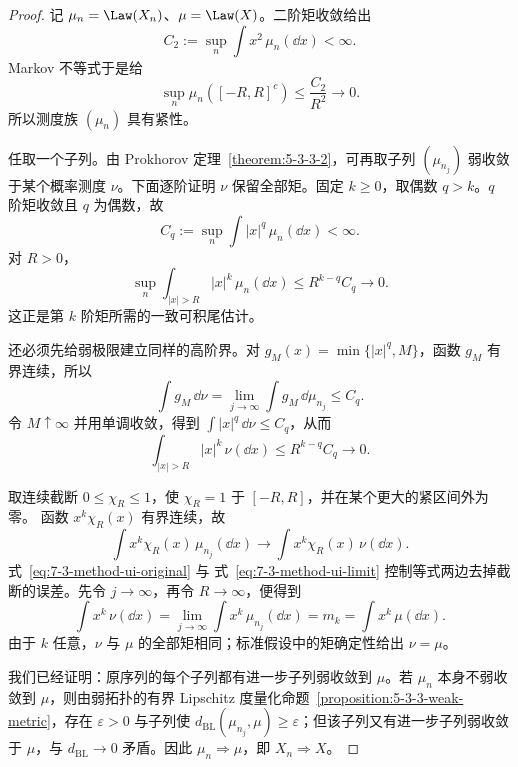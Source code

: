 \begin{proof}
记 $\mu_n=\Law(X_n)$、$\mu=\Law(X)$。二阶矩收敛给出
\[
 C_2:=\sup_n\int x^2\,\mu_n(\dd x)<\infty.
\]
Markov 不等式于是给
\[
 \sup_n\mu_n([-R,R]^c)
 \leq\frac{C_2}{R^2}\longrightarrow0.
\]
所以测度族 $(\mu_n)$ 具有紧性。

任取一个子列。由 Prokhorov 定理~\ref{theorem:5-3-3-2}，可再取子列
$(\mu_{n_j})$ 弱收敛于某个概率测度 $\nu$。下面逐阶证明 $\nu$ 保留全部矩。固定 $k\geq0$，取偶数
$q>k$。$q$ 阶矩收敛且 $q$ 为偶数，故
\[
 C_q:=\sup_n\int|x|^q\,\mu_n(\dd x)<\infty.
\]
对 $R>0$，
\begin{equation}\label{eq:7-3-method-ui-original}
 \sup_n\int_{|x|>R}|x|^k\,\mu_n(\dd x)
 \leq R^{k-q}C_q\longrightarrow0.
\end{equation}
这正是第 $k$ 阶矩所需的一致可积尾估计。

还必须先给弱极限建立同样的高阶界。对
$g_M(x)=\min\{|x|^q,M\}$，函数 $g_M$ 有界连续，所以
\[
 \int g_M\,\dd\nu
 =\lim_{j\to\infty}\int g_M\,\dd\mu_{n_j}\leq C_q.
\]
令 $M\uparrow\infty$ 并用单调收敛，得到
$\int|x|^q\,\dd\nu\leq C_q$，从而
\begin{equation}\label{eq:7-3-method-ui-limit}
 \int_{|x|>R}|x|^k\,\nu(\dd x)
 \leq R^{k-q}C_q\longrightarrow0.
\end{equation}

取连续截断 $0\leq\chi_R\leq1$，使 $\chi_R=1$ 于 $[-R,R]$，并在某个更大的紧区间外为零。
函数 $x^k\chi_R(x)$ 有界连续，故
\[
 \int x^k\chi_R(x)\,\mu_{n_j}(\dd x)
 \longrightarrow
 \int x^k\chi_R(x)\,\nu(\dd x).
\]
式~\eqref{eq:7-3-method-ui-original} 与
式~\eqref{eq:7-3-method-ui-limit} 控制等式两边去掉截断的误差。先令 $j\to\infty$，再令
$R\to\infty$，便得到
\[
 \int x^k\,\nu(\dd x)
 =\lim_{j\to\infty}\int x^k\,\mu_{n_j}(\dd x)
 =m_k=\int x^k\,\mu(\dd x).
\]
由于 $k$ 任意，$\nu$ 与 $\mu$ 的全部矩相同；标准假设中的矩确定性给出 $\nu=\mu$。

我们已经证明：原序列的每个子列都有进一步子列弱收敛到 $\mu$。若 $\mu_n$ 本身不弱收敛到
$\mu$，则由弱拓扑的有界 Lipschitz 度量化命题~\ref{proposition:5-3-3-weak-metric}，存在
$\varepsilon>0$ 与子列使
$d_{\mathrm{BL}}(\mu_{n_j},\mu)\geq\varepsilon$；但该子列又有进一步子列弱收敛于 $\mu$，与
$d_{\mathrm{BL}}\to0$ 矛盾。因此 $\mu_n\Rightarrow\mu$，即 $X_n\Rightarrow X$。
\end{proof}

